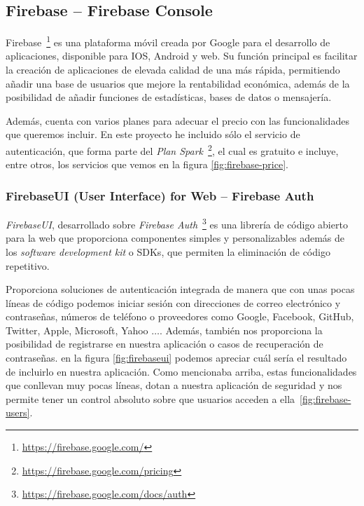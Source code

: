 \subsection{Firebase -- Firebase Console}
Firebase~\footnote{\url{https://firebase.google.com/}} es una plataforma móvil creada por Google para el desarrollo de aplicaciones, disponible para IOS, Android y web. Su función principal es facilitar la creación de aplicaciones de elevada calidad de una más rápida, permitiendo añadir una base de usuarios que mejore la rentabilidad económica, además de la posibilidad de añadir funciones de estadísticas, bases de datos o mensajería.


Además, cuenta con varios planes para adecuar el precio con las funcionalidades que queremos incluir. En este proyecto he incluido sólo el servicio de autenticación, que forma parte del \textit{Plan Spark}~\footnote{\url{https://firebase.google.com/pricing}}, el cual es gratuito e incluye, entre otros, los servicios que vemos en la figura \ref{fig:firebase-price}.



\subsubsection{FirebaseUI (User Interface) for Web -- Firebase Auth}
\textit{FirebaseUI}, desarrollado sobre \textit{Firebase Auth}~\footnote{\url{https://firebase.google.com/docs/auth}} es una librería de código abierto para la web que proporciona componentes simples y personalizables además de los \textit{software development kit} o SDKs, que permiten la eliminación de código repetitivo.


Proporciona soluciones de autenticación integrada de manera que con unas pocas líneas de código podemos iniciar sesión con direcciones de correo electrónico y contraseñas, números de teléfono o proveedores como Google, Facebook, GitHub, Twitter, Apple, Microsoft, Yahoo $\dots$. Además, también nos proporciona la posibilidad de registrarse en nuestra aplicación o casos de recuperación de contraseñas. en la figura \ref{fig:firebaseui} podemos apreciar cuál sería el resultado de incluirlo en nuestra aplicación.
Como mencionaba arriba, estas funcionalidades que conllevan muy pocas líneas, dotan a nuestra aplicación de seguridad y nos permite tener un control absoluto sobre que usuarios acceden a ella~\ref{fig:firebase-users}.



